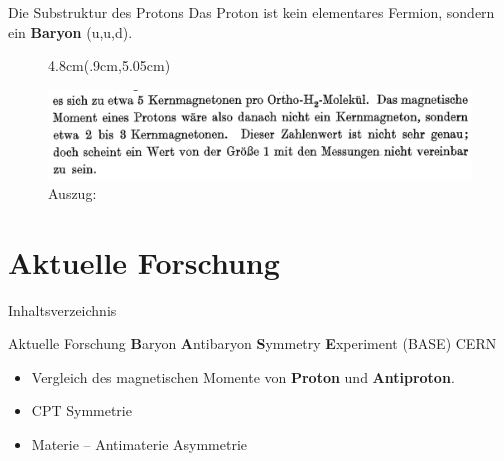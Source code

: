 \documentclass[t,9pt]{beamer}
\newcommand{\highlight}[3]{ \begin{textblock*}{#1}(#2,#3) \begin{tcolorbox} [enhanced,opacityfill=.1,colback=blue] \end{tcolorbox} \end{textblock*} } %
\begin{document}
        \begin{frame}{Die Substruktur des Protons}
                Das Proton ist kein elementares Fermion, sondern ein \textbf{Baryon} (u,u,d).
                \begin{center}
                \end{center}
                \tiny\vspace{-.2cm}\hspace{8cm}\cite{CODATA_proton_magneton}\normalsize
                \begin{figure}
                        \highlight{4.8cm}{.9cm}{5.05cm}
                        \includegraphics[width=.9\textwidth]{prosi_mag_moment_proton_nicht_1.png}
                        \caption{Auszug:\cite{FrischStern1933}}
                \end{figure}
        \end{frame}

        \section{Aktuelle Forschung}

        \begin{frame}{Inhaltsverzeichnis}
                \tableofcontents[currentsection]
        \end{frame}

        \begin{frame}{Aktuelle Forschung}
                \textbf{B}aryon \textbf{A}ntibaryon \textbf{S}ymmetry \textbf{E}xperiment (BASE) CERN
                \begin{itemize}
                        \item Vergleich des magnetischen Momente von \textbf{Proton} und \textbf{Antiproton}.
                        \item CPT Symmetrie
                        \item Materie -- Antimaterie Asymmetrie
                \end{itemize}
                \vspace{.5cm}
                \begin{center}
                \end{center}
                \vspace{-.2cm}\hspace{6.5cm}\tiny\cite{Smorra2017}\normalsize
        \end{frame}
\end{document}
